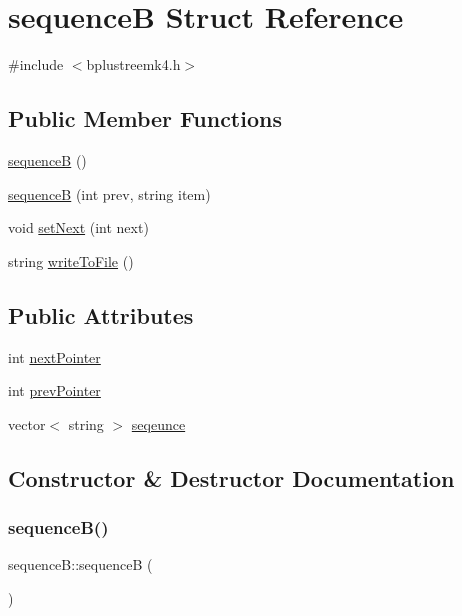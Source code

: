 \hypertarget{structsequence_b}{}\section{sequenceB Struct Reference}
\label{structsequence_b}


{\ttfamily \#include $<$bplustreemk4.\+h$>$}

\subsection*{Public Member Functions}
\begin{DoxyCompactItemize}
\item 
\mbox{\hyperlink{structsequence_b_a084309320b75d838a689e2e847057bc7}{sequenceB}} ()
\item 
\mbox{\hyperlink{structsequence_b_afbfeeebc82d4d3ad4807bae870a8e13a}{sequenceB}} (int prev, string item)
\item 
void \mbox{\hyperlink{structsequence_b_aaf3c661c2c5c00029eb796b2a0a7ca6c}{set\+Next}} (int next)
\item 
string \mbox{\hyperlink{structsequence_b_a4ac2a92234d1686dc5cbbaf9ebc1d304}{write\+To\+File}} ()
\end{DoxyCompactItemize}
\subsection*{Public Attributes}
\begin{DoxyCompactItemize}
\item 
int \mbox{\hyperlink{structsequence_b_a7fc2afa4a31d852ecaae7d0b6733ad7e}{next\+Pointer}}
\item 
int \mbox{\hyperlink{structsequence_b_a283d04c17687640e735e6fc5dc444f50}{prev\+Pointer}}
\item 
vector$<$ string $>$ \mbox{\hyperlink{structsequence_b_a4cb5526b3901d3a3348447bee4e7f623}{seqeunce}}
\end{DoxyCompactItemize}


\subsection{Constructor \& Destructor Documentation}
\mbox{\label{structsequence_b_a084309320b75d838a689e2e847057bc7}} 
\subsubsection{\texorpdfstring{sequence\+B()}{sequenceB()}\hspace{0.1cm}{\footnotesize\ttfamily [1/2]}}
{\footnotesize\ttfamily sequence\+B\+::sequenceB (\begin{DoxyParamCaption}{ }\end{DoxyParamCaption})\hspace{0.3cm}{\ttfamily [inline]}}


